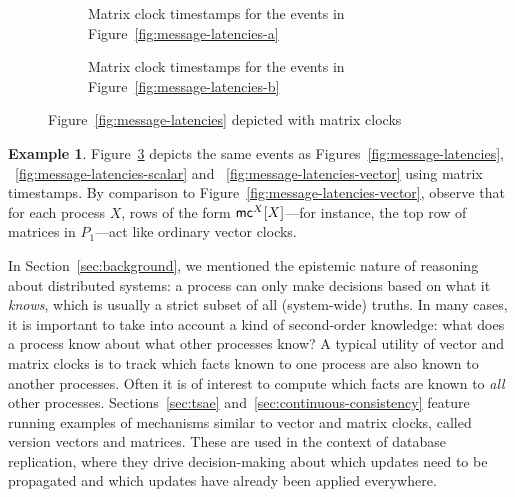 \documentclass[]             %
{NASA}                       %
\theoremstyle{definition}
\newtheorem{example}[theorem]{Example}
\begin{document}
\begin{figure}[p]
  \begingroup
  \setlength\belowcaptionskip{4ex}
  \begin{subfigure}{1\textwidth}
    \caption{Matrix clock timestamps for the events in Figure~\ref{fig:message-latencies-a}}
    \label{fig:message-latencies-matrix-a}
  \end{subfigure}
  \begin{subfigure}{1\textwidth}
    \caption{Matrix clock timestamps for the events in Figure~\ref{fig:message-latencies-b}}
    \label{fig:message-latencies-matrix-b}
  \end{subfigure}
  \caption{Figure~\ref{fig:message-latencies} depicted with matrix clocks}
  \label{fig:message-latencies-matrix}
  \endgroup
\end{figure}

\begin{example}
  Figure~\ref{fig:message-latencies-matrix} depicts the same events as
  Figures~\ref{fig:message-latencies},
 ~\ref{fig:message-latencies-scalar} and
 ~\ref{fig:message-latencies-vector} using matrix timestamps. By
  comparison to Figure~\ref{fig:message-latencies-vector}, observe
  that for each process $X$, rows of the form $\mathsf{mc}^{X}{[X]}{}$---for
  instance, the top row of matrices in $P_1$---act like ordinary vector
  clocks.
\end{example}

In Section~\ref{sec:background}, we mentioned the epistemic nature of
reasoning about distributed systems: a process can only make decisions
based on what it \emph{knows}, which is usually a strict subset of all
(system-wide) truths. In many cases, it is important to take into
account a kind of second-order knowledge: what does a process know
about what other processes know? A typical utility of vector and
matrix clocks is to track which facts known to one process are also
known to another processes. Often it is of interest to compute which
facts are known to \emph{all} other processes. Sections~\ref{sec:tsae}
and~\ref{sec:continuous-consistency} feature running examples of
mechanisms similar to vector and matrix clocks, called version vectors
and matrices. These are used in the context of database replication,
where they drive decision-making about which updates need to be
propagated and which updates have already been applied everywhere.
\end{document}

